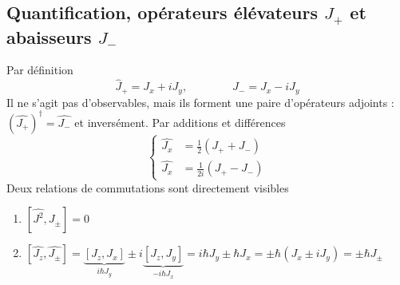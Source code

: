 	\subsection{Quantification, opérateurs élévateurs $J_+$ et abaisseurs $J_-$}
	Par définition
	\begin{equation}
	\hat{J}_+ = J_x + iJ_y,\qquad\qquad
	\hat{J}_- = J_x - iJ_y	
	\end{equation}
	Il ne s'agit pas d'observables, mais ils forment une paire d'opérateurs adjoints : $(\hat{J_+})^\dagger = \hat{J_-}$
	et inversément. Par additions et différences
	\begin{equation}
	\left\{\begin{array}{ll}
	\hat{J_x} &= \frac{1}{2}\left(J_++J_-\right)\\
	\hat{J_x} &= \frac{1}{2i}\left(J_+-J_-\right)	
	\end{array}\right.
	\end{equation}
	Deux relations de commutations sont directement visibles
	\begin{enumerate}
	\item $[\hat{J^2},J_\pm] = 0$
	\item $[\hat{J_z},\hat{J_\pm}] = \underbrace{[J_z,J_x]}_{i\hbar J_y}\pm i\underbrace{[J_z,J_y]}_{
	-i\hbar J_x} = i\hbar J_y\pm\hbar J_x = \pm \hbar(J_x\pm iJ_y) = \pm \hbar J_\pm$
	\end{enumerate}

